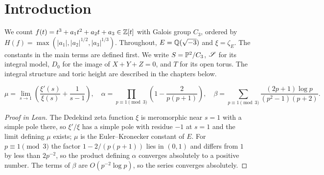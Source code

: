 

\chapter{Introduction}

We count $f(t)=t^3+a_1t^2+a_2t+a_3\in\mathbb{Z}[t]$ with Galois group $C_3$, ordered by $H(f)=\max(|a_1|,|a_2|^{1/2},|a_3|^{1/3})$. Throughout, $E=\mathbb{Q}(\sqrt{-3})$ and $\xi=\zeta_E$. The constants in the main terms are defined first. We write $S=\mathbb{P}^2/C_3$, $\mathscr{S}$ for its integral model, $D_0$ for the image of $X+Y+Z=0$, and $T$ for its open torus. The integral structure and toric height are described in the chapters below.

\begin{equationnode}

\label{eqn:introConstants}


\leanok



\begin{equation*} \mu=\lim_{s\to1} \left(\frac{\xi'(s)}{\xi(s)}+\frac{1}{s-1}\right), \quad \alpha=\prod_{p\equiv1\pmod3}\left(1-\frac{2}{p(p+1)}\right), \quad \beta=\sum_{p\equiv1\pmod3}\frac{(2p+1)\log p}{(p^2-1)(p+2)}. \end{equation*}

\end{equationnode}

\begin{proof}[Proof in Lean]

\leanok


The Dedekind zeta function $\xi$ is meromorphic near $s=1$ with a simple pole there, so $\xi'/\xi$ has a simple pole with residue $-1$ at $s=1$ and the limit defining $\mu$ exists; $\mu$ is the Euler--Kronecker constant of $E$. For $p\equiv1\pmod3$ the factor $1-2/(p(p+1))$ lies in $(0,1)$ and differs from $1$ by less than $2p^{-2}$, so the product defining $\alpha$ converges absolutely to a positive number. The terms of $\beta$ are $O(p^{-2}\log p)$, so the series converges absolutely.

\end{proof}

